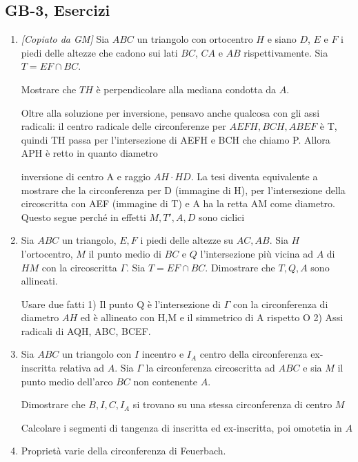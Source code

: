 \subsection{GB-3, Esercizi}
\begin{enumerate}

	\item \emph{[Copiato da GM]} Sia $ABC$ un triangolo con ortocentro $H$ e siano $D$, $E$ e $F$ i piedi delle altezze che cadono sui lati $BC$, $CA$ e $AB$ rispettivamente. Sia $T=EF\cap BC$.
	
	Mostrare che $TH$ è perpendicolare alla mediana condotta da $A$.
	
	\begin{sol}Oltre alla soluzione per inversione, pensavo anche qualcosa con gli assi radicali: il centro radicale delle circonferenze per $AEFH, BCH, ABEF$ è T, quindi TH passa per l'intersezione di AEFH e BCH che chiamo P. Allora APH è retto in quanto diametro


    inversione di centro A e raggio $AH\cdot HD$. La tesi diventa equivalente a mostrare che la circonferenza per D (immagine di H), per l'intersezione della circoscritta con AEF (immagine di T) e A ha la retta AM come diametro. Questo segue perché in effetti $M,T',A,D$ sono ciclici
	\end{sol}
	
	
	\item Sia $ABC$ un triangolo, $E,F$ i piedi delle altezze su $AC,AB$. Sia $H$ l'ortocentro, $M$ il punto medio di $BC$ e $Q$ l'intersezione più vicina ad $A$ di $HM$ con la circoscritta $\Gamma$. Sia $T=EF\cap BC$. Dimostrare che $T,Q,A$ sono allineati.
	
	\begin{sol} Usare due fatti 1) Il punto Q è l'intersezione di $\Gamma$ con la circonferenza di diametro $AH$ ed è allineato con H,M e il simmetrico di A rispetto O 2) Assi radicali di AQH, ABC, BCEF.
	\end{sol}	
	
	\item Sia $ABC$ un triangolo con $I$ incentro e $I_A$ centro della circonferenza ex-inscritta relativa ad $A$. Sia $\Gamma$ la circonferenza circoscritta ad $ABC$ e sia $M$ il punto medio dell'arco $BC$ non contenente $A$.
	
	Dimostrare che $B,I,C,I_A$ si trovano su una stessa circonferenza di centro $M$
	

	
\begin{sol}Calcolare i segmenti di tangenza di inscritta ed ex-inscritta, poi omotetia in $A$
 
\end{sol}

	
	\item Proprietà varie della circonferenza di Feuerbach. 
	\end{enumerate}
\clearpage

